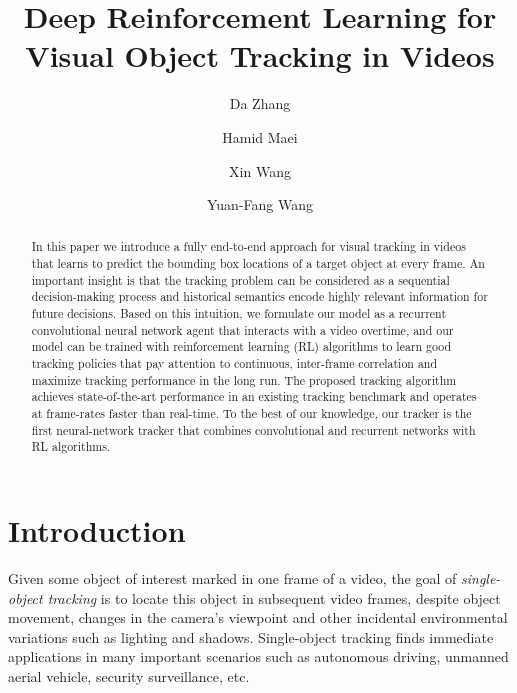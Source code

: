 \documentclass[10pt,twocolumn,letterpaper]{article}
\begin{document}
	\title{Deep Reinforcement Learning for Visual Object Tracking in Videos}
	\author[1]{Da Zhang}
    \author[2]{Hamid Maei}
    \author[1]{Xin Wang}
    \author[1]{Yuan-Fang Wang}

\maketitle


\begin{abstract}
	In this paper we introduce a fully end-to-end approach for visual tracking in videos that learns to  predict the bounding box locations of a target object at every frame. An important insight is that the tracking problem can be considered as a sequential decision-making process and historical semantics encode highly relevant information for future decisions. Based on this intuition, we formulate our model as a recurrent convolutional neural network agent that interacts with a video overtime, and our model can be trained with reinforcement learning (RL) algorithms to learn good tracking policies that pay attention to continuous, inter-frame correlation and maximize tracking performance in the long run. The proposed tracking algorithm achieves state-of-the-art performance in an existing tracking benchmark and operates at frame-rates faster than real-time. To the best of our knowledge, our tracker is the first neural-network tracker that combines convolutional and recurrent networks with RL algorithms.
\end{abstract}

\section{Introduction}

Given some object of interest marked in one frame of a video, the goal of \emph{single-object tracking} is to locate this object in subsequent video frames, despite object movement, changes in the camera's viewpoint and other incidental environmental variations such as lighting and shadows. Single-object tracking finds immediate applications in many important scenarios such as autonomous driving, unmanned aerial vehicle, security surveillance, etc.
\end{document}
